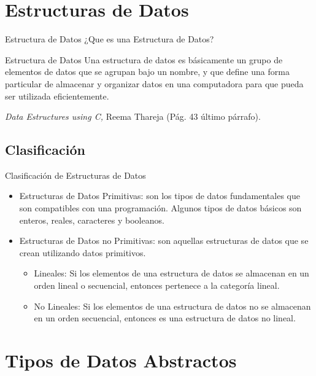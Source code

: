 \documentclass[11pt]{beamer}
\begin{document}
\section{Estructuras de Datos}

\begin{frame}{Estructura de Datos}
¿Que es una Estructura de Datos? \pause
\begin{block}{Estructura de Datos}
Una estructura de datos es básicamente un
grupo de elementos de datos que se agrupan
bajo un nombre, y que define una forma
particular de almacenar y organizar datos en
una computadora para que pueda ser utilizada
eficientemente. \\
\begin{flushright}
{\scriptsize \textit{Data Estructures using C,} Reema Thareja (Pág. 43 último párrafo).}
\end{flushright}
\end{block}
\end{frame}
\subsection{Clasificación}
\begin{frame}{Clasificación de Estructuras de Datos}
\begin{itemize}
\item Estructuras de Datos \alert{Primitivas}: son los tipos de datos fundamentales que son compatibles con una programación. Algunos tipos de datos básicos son enteros, reales, caracteres y booleanos.
\pause
\item Estructuras de Datos \alert{no Primitivas}: son aquellas
estructuras de datos que se crean utilizando datos primitivos.
\pause
\begin{itemize}
\item \alert{Lineales:} Si los elementos de una estructura de datos se almacenan en
un orden lineal o secuencial, entonces pertenece a la categoría lineal.
\pause
\item \alert{No Lineales:} Si los elementos de una estructura de datos no se
almacenan en un orden secuencial, entonces es una estructura de
datos no lineal.
\end{itemize}
\end{itemize}
\end{frame}

\section{Tipos de Datos Abstractos}
\end{document}
